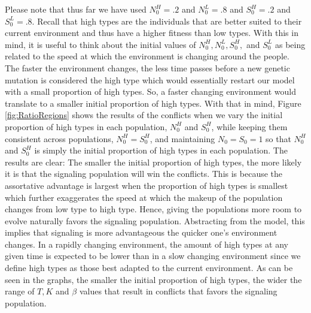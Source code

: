 Please note that thus far we have used $N_0^H = .2$ and $N_0^L = .8$ and $S_0^H = .2$ and $S_0^L = .8$. Recall that high types are the individuals that are better suited to their current environment and thus have a higher fitness than low types. With this in mind, it is useful to think about the initial values of $N_0^H, N_0^L, S_0^H,$ and $S_0^L$ as being related to the speed at which the environment is changing around the people. 
The faster the environment changes, the less time passes before a new genetic mutation is considered the high type which would essentially restart our model with a small proportion of high types. So, a faster changing environment would translate to a smaller initial proportion of high types. 
With that in mind, Figure \ref{fig:RatioRegions} shows the results of the conflicts when we vary the initial proportion of high types in each population, $N_0^H$ and $S_0^H$, while keeping them consistent across populations, $N_0^H = S_0^H$, and maintaining $N_0 = S_0 = 1$ so that $N_0^H$ and $S_0^H$ is simply the initial proportion of high types in each population. The results are clear: The smaller the initial proportion of high types, the more likely it is that the signaling population will win the conflicts. 
This is because the assortative advantage is largest when the proportion of high types is smallest which further exaggerates the speed at which the makeup of the population changes from low type to high type. Hence, giving the populations more room to evolve naturally favors the signaling population. Abstracting from the model, this implies that signaling is more advantageous the quicker one's environment changes. In a rapidly changing environment, the amount of high types at any given time is expected to be lower than in a slow changing environment since we define high types as those best adapted to the current environment. As can be seen in the graphs, the smaller the initial proportion of high types, the wider the range of $T, K$ and $\beta$ values that result in conflicts that favors the signaling population.


